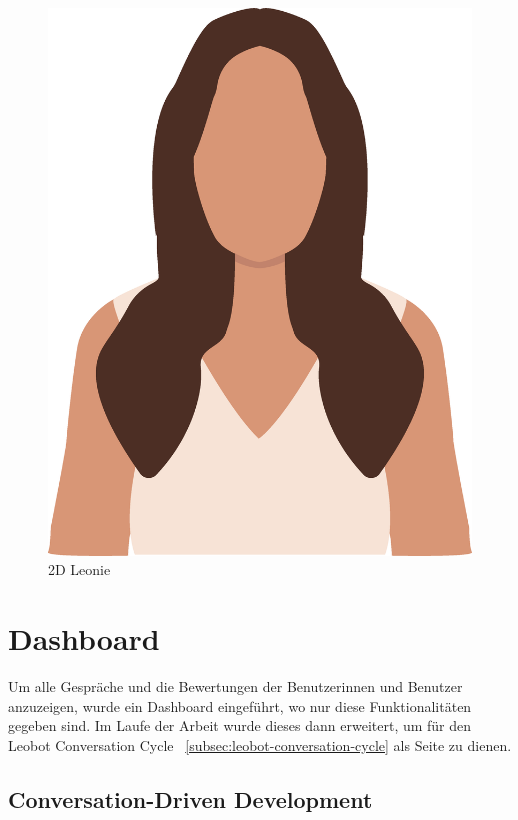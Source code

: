 \begin{figure}[hbt!]
    \centering
    \includegraphics[scale=0.3]{pics/LeonieTrans}
    \caption{2D Leonie}
    \label{fig:impl:leonieTrans}
\end{figure}

\section{Dashboard}\label{sec:dashboard}

Um alle Gespräche und die Bewertungen der Benutzerinnen und Benutzer anzuzeigen, wurde ein Dashboard eingeführt, wo nur diese Funktionalitäten gegeben sind.
Im Laufe der Arbeit wurde dieses dann erweitert, um für den Leobot Conversation Cycle ~\ref{subsec:leobot-conversation-cycle} als Seite zu dienen.

\subsection{Conversation-Driven Development}\label{cdd}

